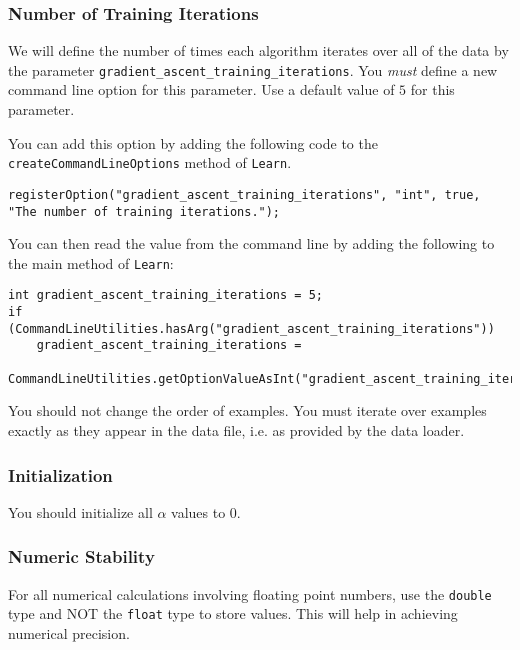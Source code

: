 \documentclass[11pt]{article}
\newcommand{\code}[1]{{\footnotesize \tt #1}}
\begin{document}
\subsubsection{Number of Training Iterations}
\label{sec:iterations}

We will define the number of times each algorithm iterates over all of the data by the parameter \code{gradient\_ascent\_training\_iterations}. You \emph{must} define a new command line option for this parameter. Use a default value of $5$ for this parameter.

You can add this option by adding the following code to the \code{createCommandLineOptions} method of \code{Learn}.
\begin{footnotesize}
\begin{verbatim}
registerOption("gradient_ascent_training_iterations", "int", true, "The number of training iterations.");
\end{verbatim}
\end{footnotesize}


You can then read the value from the command line by adding the following to the main method of \code{Learn}:
\begin{footnotesize}
\begin{verbatim}
int gradient_ascent_training_iterations = 5;
if (CommandLineUtilities.hasArg("gradient_ascent_training_iterations"))
    gradient_ascent_training_iterations = 
         CommandLineUtilities.getOptionValueAsInt("gradient_ascent_training_iterations");
\end{verbatim}
\end{footnotesize}

You should not change the order of examples. You must iterate over examples exactly as they appear in the data file, i.e. as provided by the data loader.




\subsubsection{Initialization}

You should initialize all $\alpha$ values to 0.


\subsubsection{Numeric Stability}


For all numerical calculations involving floating point numbers, use the {\tt double} type and NOT the {\tt float} type to store values.
This will help in achieving numerical precision.
\end{document}

